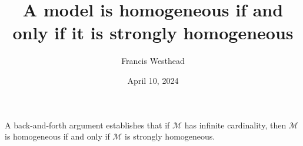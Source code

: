 \documentclass[a4paper]{article}
\title{A model is homogeneous if and only if it is strongly homogeneous}
\date{April 10, 2024}
\author{Francis Westhead}
\begin{document}
\maketitle
\par{A back-and-forth argument establishes that if \(\mathcal {M}\) has infinite cardinality, then \(\mathcal {M}\) is homogeneous
if and only if \(\mathcal {M}\) is strongly homogeneous.}
\printbibliography
\end{document}
